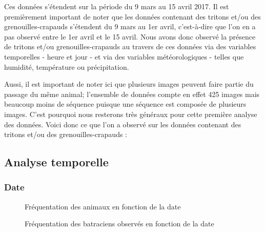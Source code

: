 \noindent Ces données s'étendent sur la période du 9 mars au 15 avril 2017. Il est premièrement important de noter que les données contenant des tritons et/ou des grenouilles-crapauds s'étendent du 9 mars au 1er avril, c'est-à-dire que l'on en a pas observé entre le 1er avril et le 15 avril. Nous avons donc observé la présence de tritons et/ou grenouilles-crapauds au travers de ces données via des variables temporelles - heure et jour - et via des variables météorologiques - telles que humidité, température ou précipitation. \newline

Aussi, il est important de noter ici que plusieurs images peuvent faire partie du passage du même animal; l'ensemble de données compte en effet 425 images mais beaucoup moins de séquence puisque une séquence est composée de plusieurs images. C'est pourquoi nous resterons très généraux pour cette première analyse des données. Voici donc ce que l'on a observé sur les données contenant des tritons et/ou des grenouilles-crapauds :

\subsection{Analyse temporelle}

\subsubsection{Date}

\begin{figure}[H]
    \centering
    \caption{Fréquentation des animaux en fonction de la date}
    \label{fig:Fréquentation des objets en fonction de la date}
\end{figure}

\begin{figure}[H]
    \centering
    \caption{Fréquentation des batraciens observés en fonction de la date}
    \label{fig:Fréquentation des crapauducs en fonction de la date}
\end{figure}

